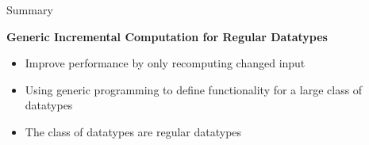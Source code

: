 \begin{slide}{Summary}
\begin{center}
  \large \textbf{Generic Incremental Computation for Regular Datatypes}
\end{center}

\vspace*{0.4cm}
\begin{itemize}
  \item Improve performance by only recomputing changed input
  \item Using generic programming to define functionality for a large class of datatypes
  \item The class of datatypes are regular datatypes
\end{itemize}
\end{slide}